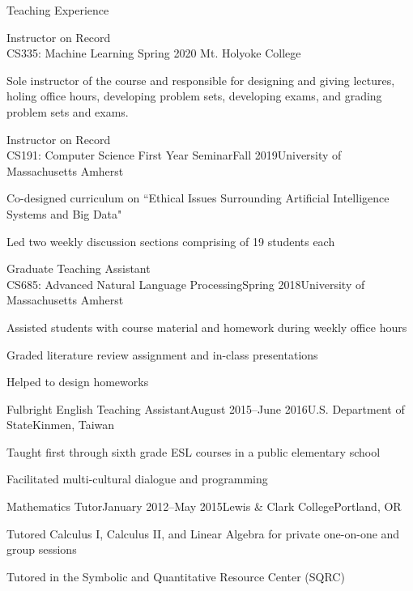 \documentclass{resume} %
\begin{document}
\begin{rSection}{Teaching Experience}

\begin{rSubsection}
{Instructor on Record \\
CS335: Machine Learning}
{Spring 2020}
{Mt. Holyoke College}{}
\item Sole instructor of the course and responsible for designing and giving lectures, holing office hours, developing problem sets, developing exams, and grading problem sets and exams. 

\end{rSubsection}

\begin{rSubsection}{Instructor on Record \\CS191: Computer Science First Year Seminar}{Fall 2019}{University of Massachusetts Amherst}{}
\item Co-designed curriculum on ``Ethical Issues Surrounding Artificial Intelligence Systems and Big Data"
\item Led two weekly discussion sections comprising of 19 students each 
\end{rSubsection}

\begin{rSubsection}{Graduate Teaching Assistant \\ CS685: Advanced Natural Language Processing}{Spring 2018}{University of Massachusetts Amherst}{}
\item Assisted students with course material and homework during weekly office hours
\item Graded literature review assignment and in-class presentations 
\item Helped to design homeworks
\end{rSubsection}

\begin{rSubsection}{Fulbright English Teaching Assistant}{August 2015--June 2016}{U.S. Department of State}{Kinmen, Taiwan}
\item Taught first through sixth grade ESL courses in a public elementary school
\item Facilitated multi-cultural dialogue and programming
\end{rSubsection}

\begin{rSubsection}{Mathematics Tutor}{January 2012--May 2015}{Lewis \& Clark College}{Portland, OR}
\item Tutored Calculus I, Calculus II, and Linear Algebra for private one-on-one and group sessions
\item Tutored in the Symbolic and Quantitative Resource Center (SQRC) 
\end{rSubsection}

\end{rSection}
\end{document}
